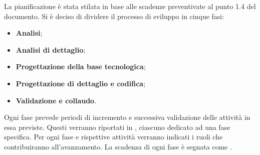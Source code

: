 La pianificazione è stata stilata in base alle scadenze preventivate al punto 1.4 del documento. Si è deciso di dividere il processo di sviluppo in cinque fasi:
\begin{itemize}
    \item \textbf{Analisi};
    \item \textbf{Analisi di dettaglio};
    \item \textbf{Progettazione della base tecnologica};
    \item \textbf{Progettazione di dettaglio e codifica};
    \item \textbf{Validazione e collaudo}.
\end{itemize}
Ogni fase prevede periodi di incremento e successiva validazione delle attività in essa previste. Questi verranno riportati in , ciascuno dedicato ad una fase specifica. Per ogni fase e rispettive attività verranno indicati i ruoli che contribuiranno all'avanzamento. La scadenza di ogni fase è segnata come .
